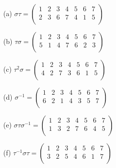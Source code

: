 \begin{mdframed}[style=darkAnswer,frametitle={Joe Starr}]
  \begin{multicols}{2}
    \begin{itemize}
      \item [(a)]{
            $\sigma\tau=
              \begin{pmatrix}
                1 & 2 & 3 & 4 & 5 & 6 & 7 \\
                2 & 3 & 6 & 7 & 4 & 1 & 5 \\
              \end{pmatrix}$
            }
      \item [(b)]{
            $\tau\sigma=
              \begin{pmatrix}
                1 & 2 & 3 & 4 & 5 & 6 & 7 \\
                5 & 1 & 4 & 7 & 6 & 2 & 3 \\
              \end{pmatrix}$
            }
      \item [(c)]{
            $\tau^2\sigma=
              \begin{pmatrix}
                1 & 2 & 3 & 4 & 5 & 6 & 7 \\
                4 & 2 & 7 & 3 & 6 & 1 & 5 \\
              \end{pmatrix}$
            }
      \item [(d)]{
            $\sigma^{-1}=
              \begin{pmatrix}
                1 & 2 & 3 & 4 & 5 & 6 & 7 \\
                6 & 2 & 1 & 4 & 3 & 5 & 7 \\
              \end{pmatrix}$
            }
      \item [(e)]{
            $\sigma\tau\sigma^{-1}=
              \begin{pmatrix}
                1 & 2 & 3 & 4 & 5 & 6 & 7 \\
                1 & 3 & 2 & 7 & 6 & 4 & 5 \\
              \end{pmatrix}$
            }
      \item [(f)]{
            $\tau^{-1}\sigma\tau=
              \begin{pmatrix}
                1 & 2 & 3 & 4 & 5 & 6 & 7 \\
                3 & 2 & 5 & 4 & 6 & 1 & 7 \\

              \end{pmatrix}$
            }
    \end{itemize}
  \end{multicols}
\end{mdframed}
